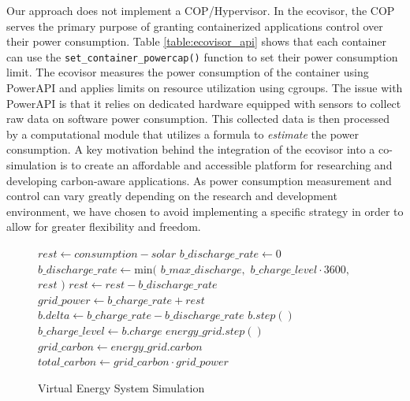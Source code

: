 Our approach does not implement a COP/Hypervisor. In the ecovisor, the COP
serves the primary purpose of granting containerized applications control over
their power consumption. Table \ref{table:ecovisor_api} shows that each
container can use the \texttt{set\_container\_powercap()} function to set their
power consumption limit. The ecovisor measures the power consumption of the
container using PowerAPI \cite{bourdon2013} and applies limits on resource
utilization using cgroups. The issue with PowerAPI is that it relies on
dedicated hardware equipped with sensors to collect raw data on software power
consumption. This collected data is then processed by a computational module
that utilizes a formula to \emph{estimate} the power consumption. A key
motivation behind the integration of the ecovisor into a co-simulation is to
create an affordable and accessible platform for researching and developing
carbon-aware applications. As power consumption measurement and control can vary
greatly depending on the research and development environment, we have chosen to
avoid implementing a specific strategy in order to allow for greater flexibility
and freedom.

\begin{figure}
    \removelatexerror
    \begin{algorithm}[H]
        \caption{Virtual Energy System Simulation}
        \label{alg:virtual_energy_system_simulation}
        $rest \gets consumption - solar$\;
         {
            $b\_discharge\_rate \gets 0$\;
        }{
            $b\_discharge\_rate \gets \text{min}($\;
            \Indp
                $b\_max\_discharge,$\;
                $b\_charge\_level \cdot 3600,$\;
                $rest$\;
            \Indm
            $)$\;
            $rest \gets rest - b\_discharge\_rate$\;
        }
        $grid\_power \gets b\_charge\_rate + rest$\;
        $b.delta \gets b\_charge\_rate - b\_discharge\_rate$\;
        $b.step()$\;
        $b\_charge\_level \gets b.charge$\;
        $energy\_grid.step()$\;
        $grid\_carbon \gets energy\_grid.carbon$\;
        $total\_carbon \gets grid\_carbon \cdot grid\_power$\;
        \vspace{3mm}
    \end{algorithm}
\end{figure}

